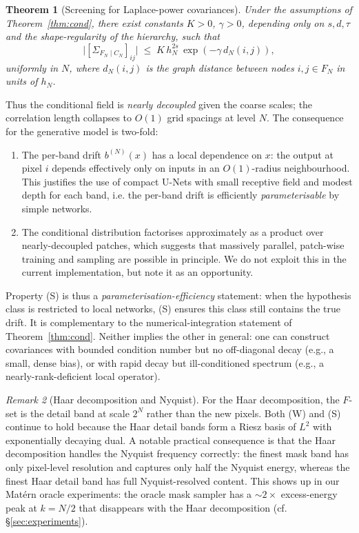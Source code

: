 \documentclass[11pt]{amsart}
\newtheorem{theorem}{Theorem}[section]
\theoremstyle{remark}
\newtheorem{remark}[theorem]{Remark}
\numberwithin{equation}{section}
\begin{document}
\begin{theorem}[Screening for Laplace-power covariances]
\label{thm:screening}
Under the assumptions of Theorem~\ref{thm:cond}, there exist constants $K>0$, $\gamma>0$, depending only on $s,d,\tau$ and the shape-regularity of the hierarchy, such that
\begin{equation}
 \big|[\Sigma_{F_N\mid C_N}]_{ij}\big| \;\le\; K\, h_N^{2s}\, \exp(-\gamma\, d_N(i,j)),
\end{equation}
uniformly in $N$, where $d_N(i,j)$ is the graph distance between nodes $i,j\in F_N$ in units of $h_N$.
\end{theorem}
Thus the conditional field is \emph{nearly decoupled} given the coarse scales; the correlation length collapses to $O(1)$ grid spacings at level $N$. The consequence for the generative model is two-fold:
\begin{enumerate}
\item The per-band drift $b^{(N)}(x)$ has a local dependence on $x$: the output at pixel $i$ depends effectively only on inputs in an $O(1)$-radius neighbourhood. This justifies the use of compact U-Nets with small receptive field and modest depth for each band, i.e. the per-band drift is efficiently \emph{parameterisable} by simple networks.
\item The conditional distribution factorises approximately as a product over nearly-decoupled patches, which suggests that massively parallel, patch-wise training and sampling are possible in principle. We do not exploit this in the current implementation, but note it as an opportunity.
\end{enumerate}
Property (S) is thus a \emph{parameterisation-efficiency} statement: when the hypothesis class is restricted to local networks, (S) ensures this class still contains the true drift. It is complementary to the numerical-integration statement of Theorem~\ref{thm:cond}. Neither implies the other in general: one can construct covariances with bounded condition number but no off-diagonal decay (e.g., a small, dense bias), or with rapid decay but ill-conditioned spectrum (e.g., a nearly-rank-deficient local operator).

\begin{remark}[Haar decomposition and Nyquist]
For the Haar decomposition, the $F$-set is the detail band at scale $2^N$ rather than the new pixels. Both (W) and (S) continue to hold because the Haar detail bands form a Riesz basis of $L^2$ with exponentially decaying dual. A notable practical consequence is that the Haar decomposition handles the Nyquist frequency correctly: the finest mask band has only pixel-level resolution and captures only half the Nyquist energy, whereas the finest Haar detail band has full Nyquist-resolved content. This shows up in our Mat\'ern oracle experiments: the oracle mask sampler has a $\sim\!2\times$ excess-energy peak at $k=N/2$ that disappears with the Haar decomposition (cf. \S\ref{sec:experiments}).
\end{remark}
\end{document}
